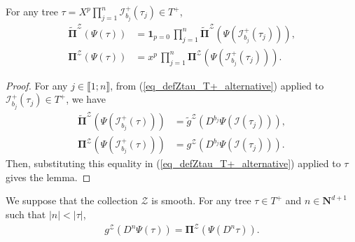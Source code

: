 \documentclass[11pt]{preprint}
\newcommand{\mcI}{\mathcal{I}}
\newcommand{\mcZ}{\mathcal{Z}}
\def\PPi{\boldsymbol{\Pi}}
\def\eqref#1{(\ref{#1})}
\newcommand{\bfN}{\mathbf{N}}
\newcommand{\bbrack}[1]{ \llbracket #1 \rrbracket }
\begin{document}
	\begin{lemma} \label{lem_PsiTau_multiplicatif}
		For any tree  $\tau=X^p \prod_{j=1}^n \mcI^+_{b_j}(\tau_j) \in T^+$,
		\begin{align*}
		\widetilde{\PPi}^\mcZ\left(\Psi(\tau)\right) & =  \mathbf{1}_{p=0} \, 	\prod_{j=1}^{n} \widetilde{\PPi}^\mcZ\left(\Psi(\mcI^+_{b_j}(\tau_j))\right), 
		\\   {\PPi}^\mcZ\left(\Psi(\tau)\right) & =  x^p \, 	\prod_{j=1}^{n} {\PPi}^\mcZ\left(\Psi(\mcI^+_{b_j}(\tau_j))\right). 
		\end{align*}
	\end{lemma}
	\begin{proof}
		For any $j\in\bbrack{1;n}$, from \eqref{eq_defZtau_T+_alternative} applied to $\mcI_{b_j}^+(\tau_j)\in T^+$, we have 
		\begin{align*}
			\widetilde{ \PPi}^\mcZ\left(\Psi(\mcI_{b_j}^+(\tau))\right) & = \widetilde{ g}^\mcZ\left(D^{b_j}\Psi(\mcI(\tau_j))\right),
			 \\
			 { \PPi}^\mcZ\left(\Psi(\mcI_{b_j}^+(\tau))\right) & = { g}^\mcZ\left(D^{b_j}\Psi(\mcI(\tau_j))\right).
		\end{align*}
		Then, substituting this equality in \eqref{eq_defZtau_T+_alternative} applied to $\tau$ gives the lemma.
	\end{proof}
	
	
	


\begin{proposition} \label{Prop_CommutDerivativePsi}We suppose that the collection $\mcZ$ is smooth. For any tree $\tau \in T^+$ and $n\in\bfN^{d+1}$ such that $|n|<|\tau|$,	
		\begin{equation}\begin{split}
				{ g}^\mcZ\left(D^n \Psi(\tau)  \right) =  { \PPi }^\mcZ\left( \Psi(D^n\tau)  \right).
		\end{split}\end{equation}
\end{proposition}
\end{document}
